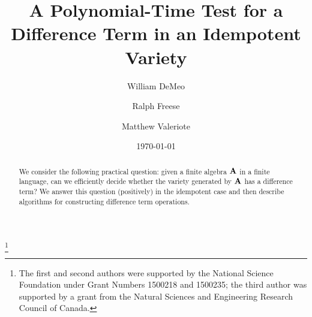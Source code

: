 

\title[A Test for a Difference Term]{A Polynomial-Time Test for a
Difference Term in an Idempotent Variety}
\author[W.~DeMeo]{William DeMeo}
\address{University of Colorado\\Mathematics Dept\\Boulder 80309\\USA}

\author[R.~Freese]{Ralph Freese}
\address{University of Hawaii\\Mathematics Dept\\Honolulu 96822\\USA}
\author[M.~Valeriote]{Matthew Valeriote}
\address{McMaster University\\Mathematics Dept\\Hamilton L8S 4K1\\
CAN}

\thanks{The first and second authors were supported by the National
Science Foundation under Grant Numbers 1500218 and 1500235; the third author was supported by a grant from the Natural Sciences and Engineering Research Council of Canada.}

\date{\today}



\maketitle

\begin{abstract}
We consider the following practical question: given a finite
algebra $\mathbf{A}$ in a
finite language, can we efficiently decide whether the variety
generated by $\mathbf{A}$
has a difference term?  We answer this question (positively) in the
idempotent case and then describe algorithms for constructing difference
term operations.
\end{abstract}

